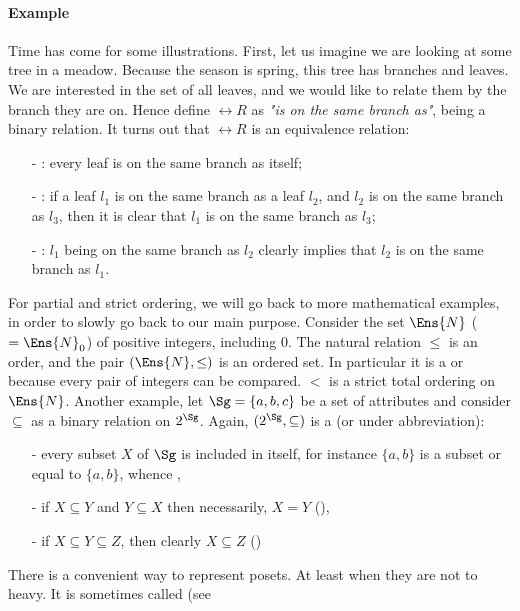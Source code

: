 \paragraph{Example} Time has come for some illustrations. First, let us imagine
we are looking at some tree in a meadow. Because the season is spring, this tree
has branches and leaves. We are interested in the set of all leaves, and we 
would like to relate them by the branch they are on. Hence define $\rel{R}$ as
\textit{"is on the same branch as"}, being a binary relation. It turns out
that $\rel{R}$ is an equivalence relation:
\begin{itemize}
	\item[-] : every leaf is on the same branch as itself;
	\item[-] : if a leaf $l_1$ is on the same branch as
	a leaf $l_2$, and $l_2$ is on the same branch as $l_3$, then it is clear
	that $l_1$ is on the same branch as $l_3$;
	\item[-] : $l_1$ being on the same branch as $l_2$ clearly
	implies that $l_2$ is on the same branch as $l_1$.
\end{itemize}
\noindent For partial and strict ordering, we will go back to more mathematical
examples, in order to slowly go back to our main purpose. Consider the set 
$\Ens{N}$ ($= \Ens{N}_0 $) of positive integers, including 0. The natural 
relation $\leq$ is an order, and the pair $(\Ens{N}, \leq)$ is an ordered set.
In particular it is a  or  because 
every pair of integers can be compared. $<$ is a strict total ordering on 
$\Ens{N}$. Another example, let $\Sg = \{a, b, c \}$ be a set of attributes and
consider $\subseteq$ as a binary relation on $2^{\Sg}$. Again, $(2^{\Sg}, 
\subseteq)$ is a  (or  under 
abbreviation):
\begin{itemize}
	\item[-] every subset $X$ of $\Sg$ is included in itself, for instance 
	$\{a, b\}$ is a subset or equal to $\{a, b\}$, whence ,
	\item[-] if $X \subseteq Y$ and $Y \subseteq X$ then necessarily, $X = Y$
	(),
	\item[-] if $X \subseteq Y \subseteq Z$, then clearly $X \subseteq Z$
	()
\end{itemize}
\noindent There is a convenient way to represent posets. At least when they are
not to heavy. It is sometimes called  (see 
